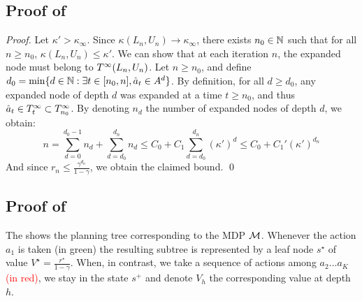 \documentclass[runningheads]{llncs}
\begin{document}
\subsection{Proof of }

\begin{proof}
Let $\kappa'>\kappa_\infty$. Since $\kappa(L_n,U_n)\rightarrow\kappa_\infty$, there exists $n_0\in\mathbb{N}$ such that for all $n\geq n_0$, $\kappa(L_n,U_n) \leq \kappa'$.
We can show that at each iteration $n$, the expanded node must belong to $T^\infty(L_n,U_n)$.
Let $n\geq n_0$, and define $d_0 = \min\{d\in\mathbb{N}: \exists t \in[n_0,n], \hat{a}_t\in A^d \}$. By definition, for all $d\geq d_0$, any expanded node of depth $d$ was expanded at a time $t\geq n_0$, and thus $\hat{a}_t\in T^\infty_t \subset T^\infty_{n_0}$. By denoting $n_d$ the number of expanded nodes of depth $d$, we obtain:
\[
n = \sum_{d=0}^{d_0-1}n_d + \sum_{d=d_0}^{d_n} n_d \leq  C_0 + C_1\sum_{d=d_0}^{d_n} (\kappa')^d \leq C_0 + C_1' (\kappa')^{d_n}
\]
And since $r_n \leq \frac{\gamma^{d_n}}{1-\gamma}$, we obtain the claimed bound.
\qed\end{proof}

\subsection{Proof of }

The  shows the planning tree corresponding to the MDP $\mathcal{M}$. Whenever the action $a_1$ is taken \textcolor{OliveGreen}{(in green)} the resulting subtree is represented by a leaf node $s^\star$ of value $V^\star = \frac{r^\star}{1-\gamma}$. When, in contrast, we take a sequence of actions among $a_2\dots a_K$ \textcolor{red}{(in red)}, we stay in the state $s^+$ and denote $V_h$ the corresponding value at depth $h$.
\end{document}
